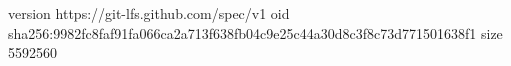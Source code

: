 version https://git-lfs.github.com/spec/v1
oid sha256:9982fc8faf91fa066ca2a713f638fb04c9e25c44a30d8c3f8c73d771501638f1
size 5592560
